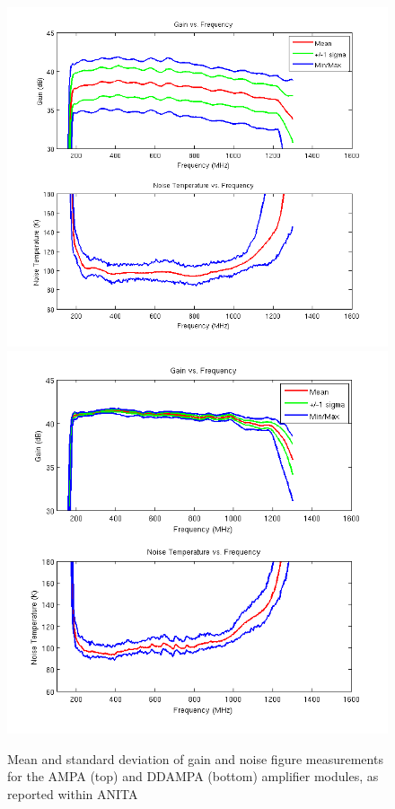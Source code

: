 \begin{figure}
\centering
	\includegraphics[height=0.45\textheight]{figures/ampas_std}
	\includegraphics[height=0.45\textheight]{figures/ddampas_std}	
	\caption{Mean and standard deviation of gain and noise figure measurements for the AMPA (top) and DDAMPA (bottom) amplifier modules, as reported within ANITA}
	\label{fig:AMPAandDDAMPA_std}
\end{figure}	
	

